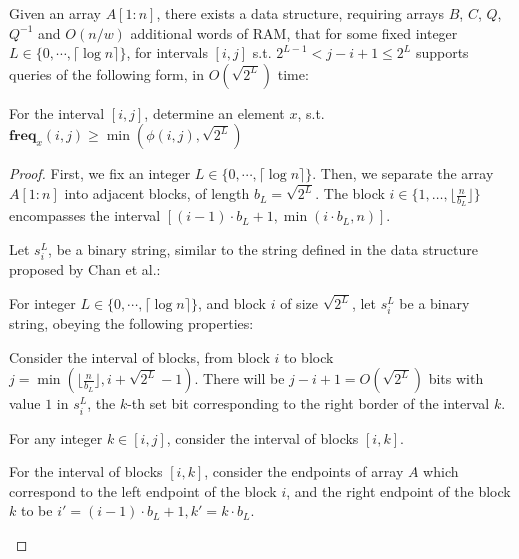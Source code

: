 \documentclass[runningheads]{llncs}
\begin{document}
\begin{lemma}
    Given an array $A[1:n]$, there exists a data structure, requiring arrays $B$, $C$, $Q$, $Q^{-1}$ and $ O(n/w) $ additional words of RAM, that for some fixed integer 
    $L \in \{ 0 , \cdots , \lceil  \log n \rceil \}$, for intervals $[i,j]$ s.t. $ 2^{L-1} < j-i+1 \leq 2^L$
    supports queries of the following form, in $O(\sqrt{2^L})$ time: 

    For the interval $[i,j]$, determine an element $x$, s.t. $\textbf{freq}_x(i,j) \geq \min(\phi(i,j), \sqrt{2^L})$

\end{lemma}
\begin{proof}
    First, we fix an integer $L \in \{ 0 , \cdots , \lceil  \log n \rceil \}$.
    Then, we separate the array $A[1:n]$ into adjacent blocks, of length $b_L = \sqrt{2^L}$. The block $i\in \{1,\dots, \lfloor \frac{n}{b_L} \rfloor\}$ 
    encompasses the interval $[(i-1) \cdot b_L +1, \min(i\cdot b_L , n)]$.
    
    Let $s_i^L$, be a binary string, similar to the string defined in the data structure proposed by Chan et al.\cite{chan2014linear}:
    
    \begin{definition}
        For integer $L \in \{ 0 , \cdots , \lceil  \log n \rceil \}$, and block $i$ of size $\sqrt{2^L}$, let $s_i^L$ be a binary string, obeying the following properties:
        
        \begin{property}
            Consider the interval of blocks, from block $i$ to block $j=\min( \lfloor \frac{n}{b_L} \rfloor, i+\sqrt{2^L}-1 )$.
            There will be $j-i+1=O(\sqrt{2^L})$ bits with value $1$ in $s_i^L$, the $k$-th set bit corresponding to the right border of the interval $k$.        
        \end{property}

        \begin{property}
            For any integer $k\in [i,j]$, consider the interval of blocks $[i,k]$.

            For the interval of blocks $[i,k]$, consider the endpoints of array $A$ which correspond to the left endpoint of the block $i$, and the right endpoint of the block $k$ 
            to be $i'=(i-1)\cdot b_L+1, k'=k\cdot b_L$.


\end{property}
\end{definition}
\end{proof}
\end{document}
